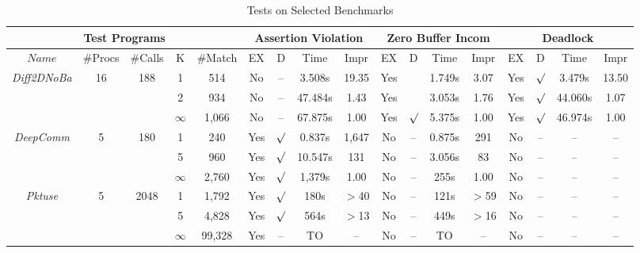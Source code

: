 \begin{savenotes}
\begin{table*}[t]
\begin{center}
\scriptsize
\caption{Tests on Selected Benchmarks}\label{table:benchmarks}
     \begin{threeparttable}
\begin{tabular}{|c|c|c|c|c|c|c|c|c|c|c|c|c|c|c|c|c|}
		\hline
         \multicolumn{5}{|c|}{Test Programs} & \multicolumn{4}{c|}{Assertion Violation} & \multicolumn{4}{c|}{Zero Buffer Incom\tnote{\textdagger}} & \multicolumn{4}{c|}{Deadlock}  \\ \hline
          $Name$ & \#Procs & \#Calls &K& \#Match & EX & D & Time& Impr &EX&D & Time & Impr& EX &D & Time &Impr\\ \hline
          \multirow{3}{*}{\textit{Diff2DNoBa}} & \multirow{3}{*}{16}& \multirow{3}{*}{188} & 1 & 514 & No & -- &3.508s & 19.35 & Yes &  &1.749s&3.07 & Yes&$\surd$ & 3.479s& 13.50 \\ \cline{4-17}
								&				&                               & 2 & 934 & No & -- & 47.484s & 1.43 & Yes & & 3.053s& 1.76 &Yes& $\surd$& 44.060s&1.07\\ \cline{4-17}
								&				&                               & $\infty$& 1,066 & No& -- & 67.875s& 1.00 & Yes & $\surd$ &5.375s&1.00&Yes & $\surd$& 46.974s &1.00\\ \hline
								\hline
	
	 \multirow{3}{*}{\textit{DeepComm}} & \multirow{3}{*}{5}& \multirow{3}{*}{180} & 1 & 240 & Yes & $\surd$& 0.837s & 1,647& No & -- & 0.875s & 291 & No & -- & --\tnote{s} & --\\ \cline{4-17}
								&				&                            & 5 & 960 & Yes & $\surd$& 10.547s & 131 & No & -- & 3.056s & 83 & No& --& --\tnote{s}& --\\ \cline{4-17}
								&				& 			     & $\infty$ & 2,760 & Yes & $\surd$ & 1,379s & 1.00 & No & -- & 255s  & 1.00 &No& --& --\tnote{s}& --\\ \hline
								\hline
								
	 \multirow{3}{*}{\textit{Pktuse}} & \multirow{3}{*}{5}& \multirow{3}{*}{2048} & 1 & 1,792 &Yes & $\surd$ & 180s & $>$40 & No & -- & 121s & $>$59 & No&--&--\tnote{s}&--\\ \cline{4-17}
								&				& 		       &  5   &    4,828      & Yes& $\surd$ & 564s & $>$13& No & -- & 449s & $>$16 &No&--&--\tnote{s}&--\\ \cline{4-17}
								&				& 		       &  $\infty$ & 99,328&Yes & -- & TO & --& No &-- &  TO & --&No&--&--\tnote{s}&--\\ \hline
								\hline
								

\end{tabular}
\end{threeparttable}
\end{center}
\end{table*}
\end{savenotes}
